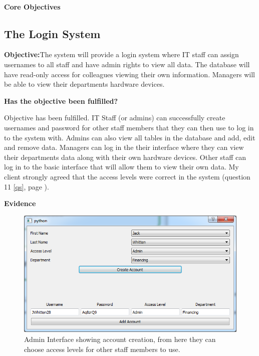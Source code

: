 \paragraph{Core Objectives}

\subsection{The Login System}

\textbf{Objective:}The system will provide a login system where IT staff can assign usernames to all staff and have admin rights to view all data. The database will have read-only access for colleagues viewing their own information. Managers will be able to view their departments hardware devices.

\textbf{Has the objective been fulfilled?}

Objective has been fulfilled. IT Staff (or admins) can successfully create usernames and password for other staff members that they can then use to log in to the system with. Admins can also view all tables in the database and add, edit and remove data. Managers can log in the their interface where they can view their departments data along with their own hardware devices. Other staff can log in to the basic interface that will allow them to view their own data. My client strongly agreed that the access levels were correct in the system (question 11 \ref{qs}, page \pageref{qs}).

\textbf{Evidence}

\begin{figure}[H]
    \includegraphics[width=\textwidth]{./Evaluation/Images/login1.png}
    \caption{Admin Interface showing account creation, from here they can choose access levels for other staff members to use.} 
\end{figure}

